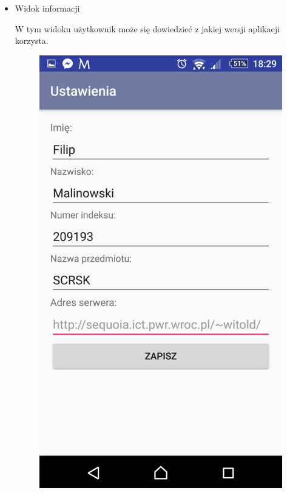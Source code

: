 \documentclass{report}
\begin{document}
\begin{itemize}
			\item Widok informacji\\
			\begin{minipage}{0.45\textwidth}
			W tym widoku użytkownik może się dowiedzieć z jakiej wersji aplikacji korzysta.
			\end{minipage}
			\begin{minipage}{0.5\textwidth}
				\begin{figure}[H]
					\begin{center}
					\includegraphics[scale=0.1]{widok_ustawien}
					\end{center}
				\end{figure}
			\end{minipage} \hfill
			

\end{itemize}
\end{document}
